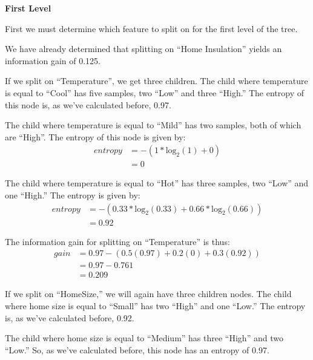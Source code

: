 \documentclass{article}
\begin{document}
\begin{enumerate}
\begin{enumerate}
                \textbf{First Level}

                First we must determine which feature to split on for the first
                level of the tree.

                We have already determined that splitting on ``Home
                Insulation'' yields an information gain of 0.125.

                If we split on ``Temperature'', we get three children. The
                child where temperature is equal to ``Cool'' has five samples,
                two ``Low'' and three ``High.'' The entropy of this node is,
                as we've calculated before, 0.97.

                The child where temperature is equal to ``Mild'' has two
                samples, both of which are ``High''. The entropy of this node
                is given by:
                \begin{align*}
                    entropy & = - (1 * \text{log}_2(1) + 0) \\
                            & = 0
                \end{align*}

                The child where temperature is equal to ``Hot'' has three
                samples, two ``Low'' and one ``High.'' The entropy is given by:
                \begin{align*}
                    entropy & = - (0.33 * \text{log}_2(0.33) + 0.66 * \text{log}_2(0.66)) \\
                    & = 0.92
                \end{align*}

                The information gain for splitting on ``Temperature'' is thus:
                \begin{align*}
                    gain &= 0.97 - \left(0.5(0.97) + 0.2(0) + 0.3(0.92)\right) \\
                    & = 0.97 - 0.761 \\
                    & = 0.209
                \end{align*}

                If we split on ``HomeSize,'' we will again have three children
                nodes. The child where home size is equal to ``Small'' has two
                ``High'' and one ``Low.'' The entropy is, as we've calculated
                before, 0.92.

                The child where home size is equal to ``Medium'' has three
                ``High'' and two ``Low.'' So, as we've calculated before, this
                node has an entropy of 0.97.


\end{enumerate}
\end{enumerate}
\end{document}
